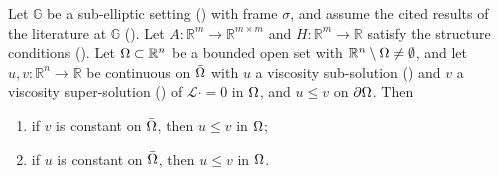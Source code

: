 \begin{theorem}[Theorem~1.3(ii)]
Let $\mathbb G$ be a sub-elliptic setting () with frame $\sigma$, and
assume the cited results of the literature at $\mathbb G$ (). Let
$A:\mathbb R^{m}\to\mathbb R^{m\times m}$ and $H:\mathbb R^{m}\to\mathbb R$ satisfy the
structure conditions (). Let $\Omega\subset\mathbb R^{n}$ be a
bounded open set with $\mathbb R^{n}\setminus\Omega\ne\emptyset$, and let
$u,v:\mathbb R^{n}\to\mathbb R$ be continuous on $\bar{\Omega}$ with $u$ a viscosity sub-solution
() and $v$ a viscosity super-solution () of
$\mathcal L\cdot=0$ in $\Omega$, and $u\le v$ on $\partial\Omega$. Then
\begin{enumerate}
\item if $v$ is constant on $\bar{\Omega}$, then $u\le v$ in $\Omega$;
\item if $u$ is constant on $\bar{\Omega}$, then $u\le v$ in $\Omega$.
\end{enumerate}
\end{theorem}
